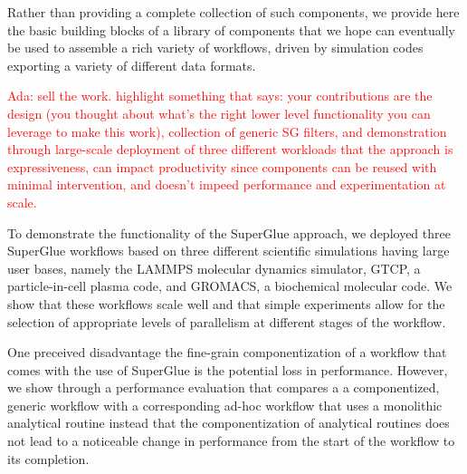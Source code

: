 \documentclass[conference]{IEEEtran}
\newcommand{\ada}[1]{\textcolor{red}{Ada: #1}}
\begin{document}
Rather than providing a complete collection of such components,
we provide here the basic building
blocks of a library of components that we hope can
eventually be used to assemble
a rich variety of workflows, driven by simulation codes
exporting a variety of different data formats.


\ada{sell the work. highlight something that says: your contributions are the design (you thought
  about what's the right lower level functionality you can leverage to
  make this work), collection of generic SG filters, and demonstration
through large-scale deployment of three different workloads that the
approach is 
expressiveness, can impact productivity since components can be reused
with minimal intervention, and doesn't impeed performance and
experimentation at scale. }

To demonstrate the functionality of the SuperGlue approach,
we deployed three SuperGlue workflows based on three different
scientific simulations having large user bases,
namely the LAMMPS molecular dynamics simulator,
GTCP, a particle-in-cell plasma code, and GROMACS,
a biochemical molecular code. We show
that these workflows scale well and that
simple experiments allow for the selection of
appropriate levels of parallelism at different
stages of the workflow.

One preceived disadvantage the fine-grain componentization
of a workflow that comes with the use of SuperGlue
is the potential loss in performance.
However, we show through a performance evaluation that
compares a 
a componentized, generic workflow with a corresponding
ad-hoc workflow that uses a monolithic analytical routine
instead that the componentization of analytical routines
does not lead to a noticeable change in performance
from the start of the workflow to its completion.


\end{document}
